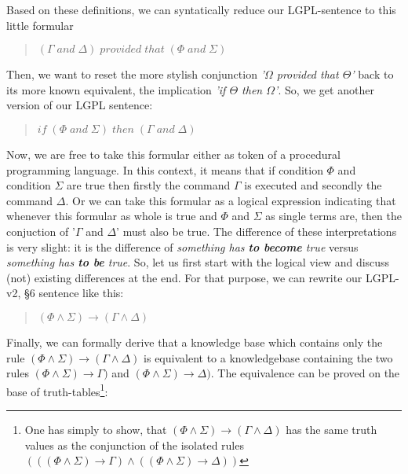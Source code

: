 Based on these definitions, we can syntatically reduce our LGPL-sentence to this
little formular

\begin{quote}\noindent $(\Gamma \; and \; \Delta) \; provided \;
that \; (\Phi \; and \; \Sigma)$
\end{quote}

Then, we want to reset the more stylish conjunction \emph{'$\Omega$ provided
that $\Theta$'} back to its more known equivalent, the implication \emph{'if
$\Theta$ then $\Omega$'}. So, we get another version of our LGPL sentence:

\begin{quote}\noindent $if \; (\Phi \; and \; \Sigma) \; then \;
(\Gamma \; and \; \Delta)$
\end{quote}

Now, we are free to take this formular either as token of a procedural
programming language. In this context, it means that if condition $\Phi$ and
condition $\Sigma$ are true then firstly the command $\Gamma$ is executed and
secondly the command $\Delta$. Or we can take this formular as a logical
expression indicating that whenever this formular as whole is true and $\Phi$
and $\Sigma$ as single terms are, then the conjuction of '$\Gamma$ and $\Delta$'
must also be true. The difference of these interpretations is very slight: it is
the difference of \emph{something has \textbf{to become} true} versus
\emph{something has \textbf{to be} true}. So, let us first start with the
logical view and discuss (not) existing differences at the end. For that
purpose, we can rewrite our LGPL-v2, §6 sentence like this:

\begin{quote}\noindent
$(\Phi \wedge \Sigma) \rightarrow (\Gamma \wedge \Delta)$
\end{quote}

Finally, we can formally derive that a knowledge base which contains only the
rule $(\Phi \wedge \Sigma) \rightarrow (\Gamma \wedge \Delta)$ is equivalent to
a knowledgebase containing the two rules $(\Phi \wedge \Sigma) \rightarrow
\Gamma)$ and $(\Phi \wedge \Sigma) \rightarrow \Delta)$. The equivalence can be
proved on the base of truth-tables\footnote{One has simply to show, that $(\Phi
\wedge \Sigma) \rightarrow (\Gamma \wedge \Delta)$ has the same truth values as
the conjunction of the isolated rules $(((\Phi \wedge \Sigma) \rightarrow
\Gamma) \wedge ((\Phi \wedge \Sigma) \rightarrow \Delta))$

 }:

